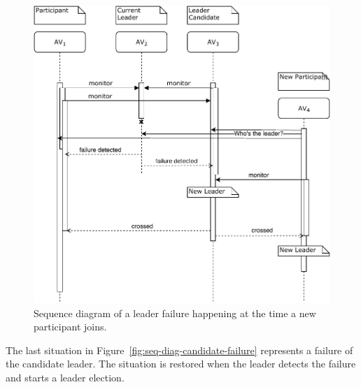 \documentclass{memoir}
\begin{document}
\begin{figure}
	\centering
	\includegraphics[width=\linewidth]{sequence_diagrams/new_participant.pdf}
	\caption{Sequence diagram of a leader failure happening at the time a new participant joins.}
	\label{fig:seq-diag-new-participant}
\end{figure}

The last situation in Figure~\ref{fig:seq-diag-candidate-failure} represents a failure of the candidate leader. The situation is restored when the leader detects the failure and starts a leader election.
\end{document}

